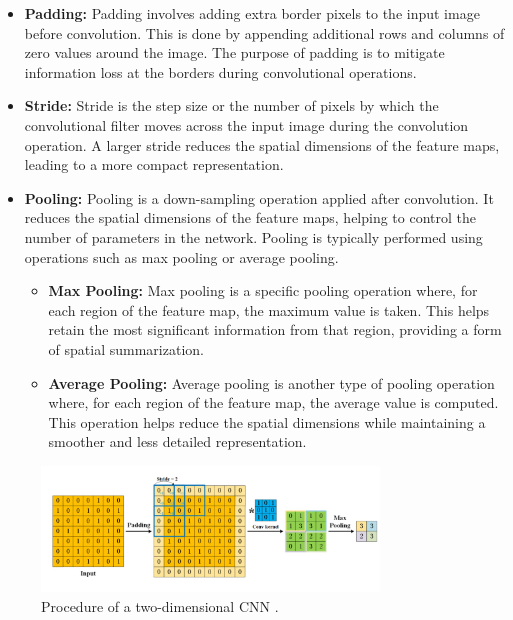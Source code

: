 \begin{itemize}
	\item \textbf{Padding:} Padding involves adding extra border pixels to the input image before convolution. This is done by appending additional rows and columns of zero values around the image. The purpose of padding is to mitigate information loss at the borders during convolutional operations.
	
	\item \textbf{Stride:} Stride is the step size or the number of pixels by which the convolutional filter moves across the input image during the convolution operation. A larger stride reduces the spatial dimensions of the feature maps, leading to a more compact representation.
	
	\item \textbf{Pooling:} Pooling is a down-sampling operation applied after convolution. It reduces the spatial dimensions of the feature maps, helping to control the number of parameters in the network. Pooling is typically performed using operations such as max pooling or average pooling.
	
	\begin{itemize}
		\item \textbf{Max Pooling:} Max pooling is a specific pooling operation where, for each region of the feature map, the maximum value is taken. This helps retain the most significant information from that region, providing a form of spatial summarization.
		
		\item \textbf{Average Pooling:} Average pooling is another type of pooling operation where, for each region of the feature map, the average value is computed. This operation helps reduce the spatial dimensions while maintaining a smoother and less detailed representation.
	\end{itemize}
\end{itemize}


\begin{figure}[h!]
	\centering
	\includegraphics[width=0.8\textwidth]{Images/DataMining/ProcedureCNN}
	\caption{Procedure of a two-dimensional CNN \cite{Li:2021}.} \label{fig:ProcedureCNN}
\end{figure}

